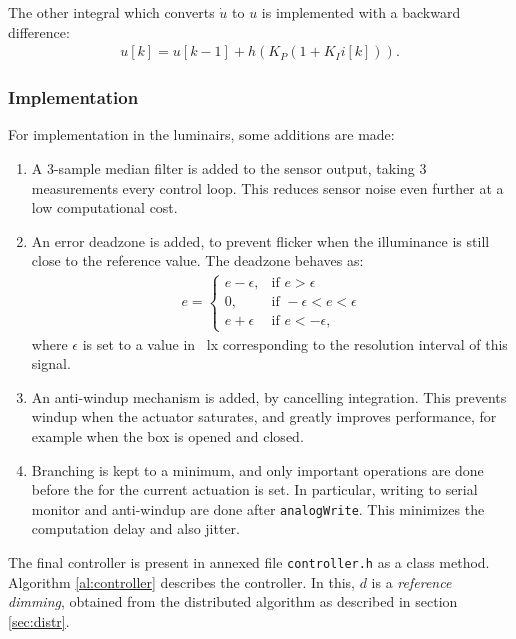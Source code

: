 \documentclass[english,fira]{ist-report}
\begin{document}
The other integral which converts $\Dot{u}$ to $u$ is implemented with a backward  difference:
\begin{align}
    u[k] = u[k-1] + h\left( K_P (1+K_I i[k]) \right).
\end{align}

\subsubsection{Implementation}

For implementation in the luminairs, some additions are made:
\begin{enumerate}
    \item A 3-sample median filter is added to the sensor output, taking 3 measurements every control loop. This reduces sensor noise even further at a low computational cost.
    \item An error deadzone is added, to prevent flicker when the illuminance is still close to the reference value. The deadzone behaves as:
    \begin{align}
        e = 
        \begin{cases}
            e-\epsilon, & \text{if } e>\epsilon \\
            0,          & \text{if } -\epsilon<e<\epsilon \\
            e+\epsilon  & \text{if } e<-\epsilon,
        \end{cases}
        \label{eq:deadzone}
    \end{align}
    where $\epsilon$ is set to a value in \SI{}{\lux} corresponding to the resolution interval of this signal.
    \item An anti-windup mechanism is added, by cancelling integration. This prevents windup when the actuator saturates, and greatly improves performance, for example when the box is opened and closed.
    \item Branching is kept to a minimum, and only important operations are done before the for the current actuation is set. In particular, writing to serial monitor and anti-windup are done after \texttt{analogWrite}. This minimizes the computation delay and also jitter. 
\end{enumerate}

The final controller is present in annexed file \texttt{controller.h} as a class method. Algorithm \ref{al:controller} describes the controller. In this, $d$ is a \textit{reference dimming}, obtained from the distributed algorithm as described in section \ref{sec:distr}.
\end{document}
